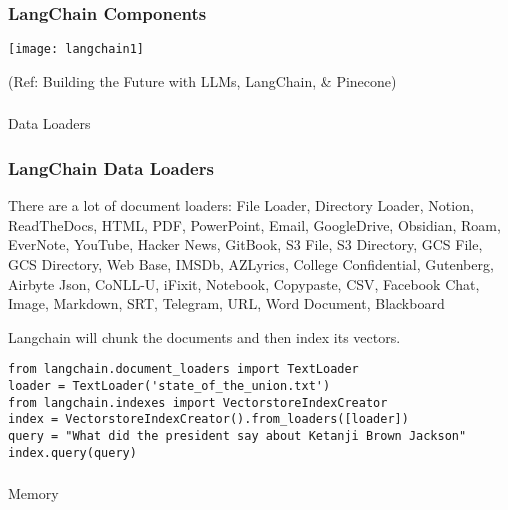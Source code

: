 \begin{frame}[fragile]\frametitle{LangChain Components}

\begin{center}
\texttt{[image: langchain1]}
\end{center}	  

{\tiny (Ref: Building the Future with LLMs, LangChain, \& Pinecone)}
\end{frame}

\begin{frame}[fragile]\frametitle{}
\begin{center}
{\Large Data Loaders}
\end{center}
\end{frame}

\begin{frame}[fragile]\frametitle{LangChain Data Loaders}

There are a lot of document loaders: File Loader, Directory Loader, Notion, ReadTheDocs, HTML, PDF, PowerPoint, Email, GoogleDrive, Obsidian, Roam, EverNote, YouTube, Hacker News, GitBook, S3 File, S3 Directory, GCS File, GCS Directory, Web Base, IMSDb, AZLyrics, College Confidential, Gutenberg, Airbyte Json, CoNLL-U, iFixit, Notebook, Copypaste, CSV, Facebook Chat, Image, Markdown, SRT, Telegram, URL, Word Document, Blackboard

Langchain will chunk the documents and then index its vectors.

\begin{lstlisting}
from langchain.document_loaders import TextLoader
loader = TextLoader('state_of_the_union.txt')
from langchain.indexes import VectorstoreIndexCreator
index = VectorstoreIndexCreator().from_loaders([loader])
query = "What did the president say about Ketanji Brown Jackson"
index.query(query)
\end{lstlisting}	  

\end{frame}


\begin{frame}[fragile]\frametitle{}
\begin{center}
{\Large Memory}
\end{center}
\end{frame}

